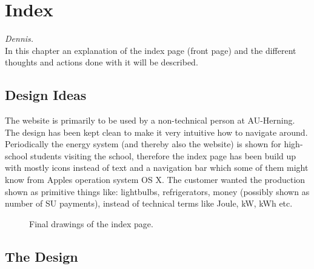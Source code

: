 \newpage
\chapter{Index}\textit{Dennis.}\\
In this chapter an explanation of the index page (front page)  and the different thoughts and actions done with it will be described.  
\section{Design Ideas}
The website is primarily to be used by a non-technical person at AU-Herning. The design has been kept clean to make it very intuitive how to navigate around. Periodically the energy system (and thereby also the website) is shown for high-school students visiting the school, therefore the index page has been build up with mostly icons instead of text and a navigation bar which some of them might know from Apples operation system OS X. The customer wanted the production shown as primitive things like: lightbulbs, refrigerators, money (possibly shown as number of SU payments), instead of technical terms like Joule, kW, kWh etc.
\begin{figure}[h!]
	\center
		\setlength\fboxsep{0pt}
		\setlength\fboxrule{1pt}
   	\caption{Final drawings of the index page.}
   	\label{fig:index_page_design}
\end{figure}
\section{The Design}

